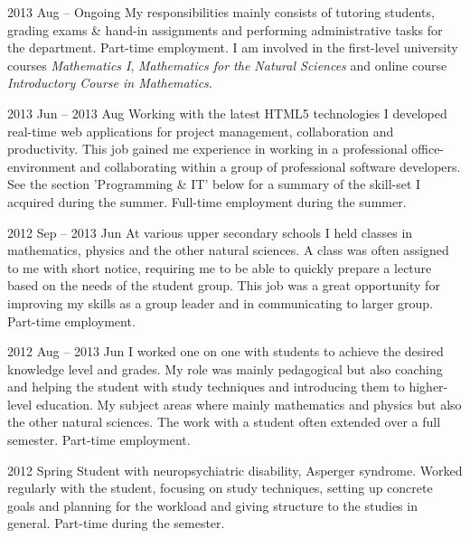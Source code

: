 
      {2013 Aug -- Ongoing}
      {My responsibilities mainly consists of tutoring students, grading exams \& hand-in assignments and
       performing administrative tasks for the department. Part-time employment.
       I am involved in the first-level university courses \emph{Mathematics I},
       \emph{Mathematics for the Natural Sciences} and online course \emph{Introductory Course in Mathematics}.}

      {2013 Jun -- 2013 Aug}
      {Working with the latest HTML5 technologies I developed real-time
       web applications for project management, collaboration and productivity.
       This job gained me experience in working in a professional office-environment
       and collaborating within a group of professional software developers.
       See the section 'Programming \& IT' below for a summary of the skill-set I acquired during the summer.
       Full-time employment during the summer.}

      {2012 Sep -- 2013 Jun}
      {At various upper secondary schools I held classes in
       mathematics, physics and the other natural sciences.
       A class was often assigned to me with
       short notice, requiring me to be able to quickly prepare a lecture
       based on the needs of the student group. This job was a great
       opportunity for improving my skills as a group leader and in
       communicating to larger group. Part-time employment.}

      {2012 Aug -- 2013 Jun}
      {I worked one on one with students to achieve the desired knowledge level and
       grades. My role was mainly pedagogical but also coaching and helping
       the student with study techniques and introducing them to higher-level
       education. My subject areas where mainly mathematics and physics but also the
       other natural sciences. The work with a student often extended over a full semester.
       Part-time employment.}

      {2012 Spring}
      {Student with neuropsychiatric disability, Asperger syndrome.
       Worked regularly with the student, focusing on study techniques,
       setting up concrete goals and planning for the workload and giving
       structure to the studies in general. Part-time during the semester.}
